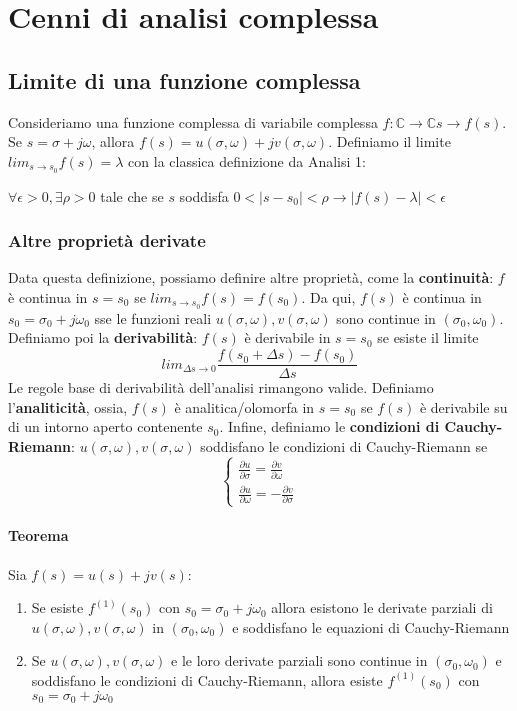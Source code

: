 \documentclass[11pt]{article}
\begin{document}
\section{Cenni di analisi complessa}
\subsection{Limite di una funzione complessa}
Consideriamo una funzione complessa di variabile complessa $f: \mathbb{C} \rightarrow \mathbb{C} s \rightarrow f(s)$. Se $s = \sigma + j \omega$, allora $f(s) = u(\sigma, \omega)+ jv(\sigma, \omega)$. Definiamo il limite $lim_{s\rightarrow s_0} f(s) = \lambda$ con la classica definizione da Analisi 1:
\begin{center}
    $\forall \epsilon >0, \exists \rho >0$ tale che se $s$ soddisfa $0<|s-s_0|<\rho \rightarrow |f(s) - \lambda| < \epsilon$
\end{center}
\subsubsection{Altre proprietà derivate}
Data questa definizione, possiamo definire altre proprietà, come la \textbf{continuità}: $f$ è continua in $s=s_0$ se $lim_{s\rightarrow s_0} f(s) = f(s_0)$. Da qui, $f(s)$ è continua in $s_0 = \sigma_0 + j\omega_0$ sse le funzioni reali $u(\sigma, \omega), v(\sigma, \omega)$ sono continue in $(\sigma_0, \omega_0)$. Definiamo poi la \textbf{derivabilità}: $f(s)$ è derivabile in $s=s_0$ se esiste il limite 
\begin{displaymath}
    lim_{\Delta s\rightarrow 0} \frac{f(s_0 + \Delta s) - f(s_0)}{\Delta s}
\end{displaymath}
Le regole base di derivabilità dell'analisi rimangono valide. Definiamo l'\textbf{analiticità}, ossia, $f(s)$ è analitica/olomorfa in $s=s_0$ se $f(s)$ è derivabile su di un intorno aperto contenente $s_0$. 
Infine, definiamo le \textbf{condizioni di Cauchy-Riemann}: $u(\sigma, \omega), v(\sigma, \omega)$ soddisfano le condizioni di Cauchy-Riemann se 
\begin{displaymath}
    \begin{cases} 
        \frac{\partial u}{\partial \sigma} = \frac{\partial v}{\partial \omega} \\ \frac{\partial u}{\partial \omega} = - \frac{\partial v}{\partial \sigma}
    \end{cases}
\end{displaymath}
\paragraph{Teorema}
Sia $f(s) = u(s) + jv(s)$:
\begin{enumerate}
    \item Se esiste $f^{(1)} (s_0)$ con $s_0 = \sigma_0 + j\omega_0$ allora esistono le derivate parziali di $u(\sigma, \omega), v(\sigma, \omega)$ in $(\sigma_0, \omega_0)$ e soddisfano le equazioni di Cauchy-Riemann
    \item Se $u(\sigma, \omega), v(\sigma, \omega)$ e le loro derivate parziali sono continue in $(\sigma_0, \omega_0)$ e soddisfano le condizioni di Cauchy-Riemann, allora esiste $f^{(1)} (s_0)$ con $s_0 = \sigma_0 + j\omega_0$
\end{enumerate}
\end{document}
